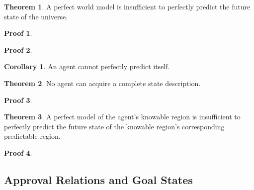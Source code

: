 \documentclass[12pt]{article}
\theoremstyle{definition}
\newtheorem{cor}{Corollary}
\newtheorem{thm}{Theorem}
\newtheorem{prf}{Proof}
\begin{document}
\begin{thm}

   A perfect world model is insufficient to perfectly predict the future state
   of the universe.

\end{thm}

\begin{prf}
\end{prf}

\begin{prf}
\end{prf}

\begin{cor}
   An agent cannot perfectly predict itself.
\end{cor}

\begin{thm}

   No agent can acquire a complete state description.

\end{thm}

\begin{prf}
\end{prf}

\begin{thm}

   A perfect model of the agent's knowable region is insufficient to perfectly
   predict the future state of the knowable region's corresponding predictable
   region.

\end{thm}

\begin{prf}
\end{prf}


\subsection{Approval Relations and Goal States}
\label{sec:goals}


\end{document}

